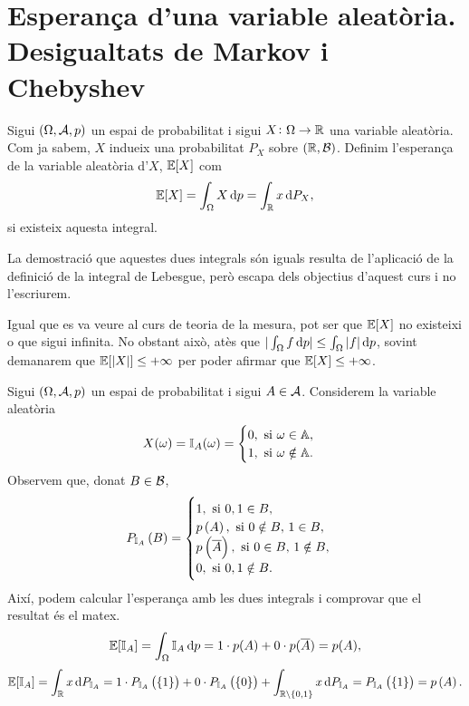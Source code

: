 
\section{Esperança d'una variable aleatòria. Desigualtats de Markov i Chebyshev}

\begin{defi}
    Sigui $(\Omega,\mathcal{A},p)$ un espai de probabilitat i sigui $X\colon\Omega\to\mathbb{R}$ una variable aleatòria. Com ja sabem, $X$ indueix una probabilitat $P_X$ sobre $\left(\mathbb{R},\mathcal{B}\right)$. Definim l'esperança de la variable aleatòria d'$X$, $\operatorname{\mathbb{E}}[X]$ com
    \[
        \esp[X] = \int_{\Omega}{X \dif p} = \int_{\real}{x \dif P_X},
    \]
    si existeix aquesta integral.
\end{defi}

\begin{obs}
    La demostració que aquestes dues integrals són iguals resulta de l'aplicació de la definició de la integral de Lebesgue, però escapa dels objectius d'aquest curs i no l'escriurem.
\end{obs}

\begin{obs}
    Igual que es va veure al curs de teoria de la mesura, pot ser que $\operatorname{\mathbb{E}}[X]$ no existeixi o que sigui infinita.
    No obstant això, atès que $|\int_{\Omega}{f\dif p}| \le \int_{\Omega}{|f|\dif p}$, sovint demanarem que
    $\operatorname{\mathbb{E}}[|X|] \le +\infty$ per poder afirmar que $\operatorname{\mathbb{E}}[X] \le +\infty$.
\end{obs}

\begin{example}
    Sigui $\left( \Omega, \mathcal{A}, p\right)$ un espai de probabilitat i sigui $A\in\mathcal{A}$. Considerem la variable aleatòria
    \[
        X(\omega) = \mathbb{I}_A(\omega) = \begin{cases}
        0,\text{ si } \omega\in \mathbb{A}, \\ 1,\text{ si } \omega \notin \mathbb{A}.
        \end{cases}
    \]
    Observem que, donat $B\in\mathcal{B}$,
    \[
        P_{\mathbb{I}_A}\left( B\right) = \begin{cases}
            1, \text{ si } 0,1\in B,\\
            p\left( A\right), \text{ si } 0\notin B,\, 1\in B,\\
            p\left( \overline{A}\right), \text{ si } 0\in B,\, 1\notin B,\\
            0, \text{ si } 0,1\notin B.
        \end{cases}
    \]
    Així, podem calcular l'esperança amb les dues integrals i comprovar que el resultat és el matex.
    \[
        \esp[\mathbb{I}_A] = \int_\Omega{\mathbb{I}_A \dif p} = 1\cdot p(A) + 0\cdot p(\comp{A}) = p(A),
    \]
    \[
        \esp[\mathbb{I}_A] = \int_\real{x\dif P_{\mathbb{I}_A}} = 1\cdot P_{\mathbb{I}_A}\lp\lc 1\rc\rp + 0\cdot P_{\mathbb{I}_A}\lp\lc 0\rc\rp+ \int_{\real\setminus\lc 0,1\rc} x\dif P_{\mathbb{I}_A} = P_{\mathbb{I}_A}\lp\lc 1\rc\rp = p\lp A\rp.
    \]
\end{example}


